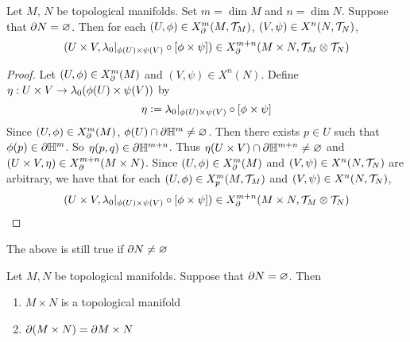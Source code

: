\documentclass{book}
\begin{document}
\begin{ex} 
	Let $M$, $N$ be topological manifolds. Set $m = \dim M$ and $n = \dim N$. Suppose that $\partial N = \varnothing$. Then for each $(U, \phi) \in X^m_{\partial}(M, \mathcal{T}_M)$, $(V, \psi) \in X^n(N, \mathcal{T}_N)$, 
	$$(U \times V, \lambda_0|_{\phi(U) \times \psi(V)} \circ [\phi \times \psi]) \in X^{m+n}_{\partial}(M \times N,  \mathcal{T}_M \otimes \mathcal{T}_N)$$ 
\end{ex}

\begin{proof}
	Let $(U, \phi) \in X^m_{\partial}(M)$ and $(V, \psi) \in X^n(N)$. Define $\eta: U \times V \rightarrow \lambda_0(\phi(U) \times \psi(V))$ by 
	$$\eta \vcentcolon= \lambda_0|_{\phi(U) \times \psi(V)} \circ [\phi \times \psi]$$ 
	Since $(U, \phi) \in X^m_{\partial}(M)$, $\phi(U) \cap \partial \mathbb{H}^m \neq \varnothing$. Then there exists $p \in U$ such that $\phi(p) \in \partial \mathbb{H}^m$. So $\eta(p,q) \in \partial \mathbb{H}^{m+n}$. Thus $\eta(U \times V) \cap \partial \mathbb{H}^{m+n} \neq \varnothing$ and $(U \times V, \eta) \in X^{m+n}_{\partial}(M \times N)$. Since $(U, \phi) \in X^m_{\partial}(M)$ and $(V, \psi) \in X^n(N, \mathcal{T}_N)$ are arbitrary, we have that for each $(U, \phi) \in X^m_p(M, \mathcal{T}_M)$ and $(V, \psi) \in X^n(N, \mathcal{T}_N)$, 
	$$(U \times V, \lambda_0|_{\phi(U) \times \psi(V)} \circ [\phi \times \psi]) \in X^{m+n}_{\partial}(M \times N,  \mathcal{T}_M \otimes \mathcal{T}_N)$$ 
\end{proof}

\begin{note}
	The above is still true if $\partial N \neq \varnothing$
\end{note}

\begin{ex} 
	Let $M,N$ be topological manifolds. Suppose that $\partial N = \varnothing$. Then 
	\begin{enumerate}
		\item $M \times N$ is a topological manifold
		\item $\partial(M \times N) = \partial M \times N$
	\end{enumerate}
\end{ex}
\end{document}
